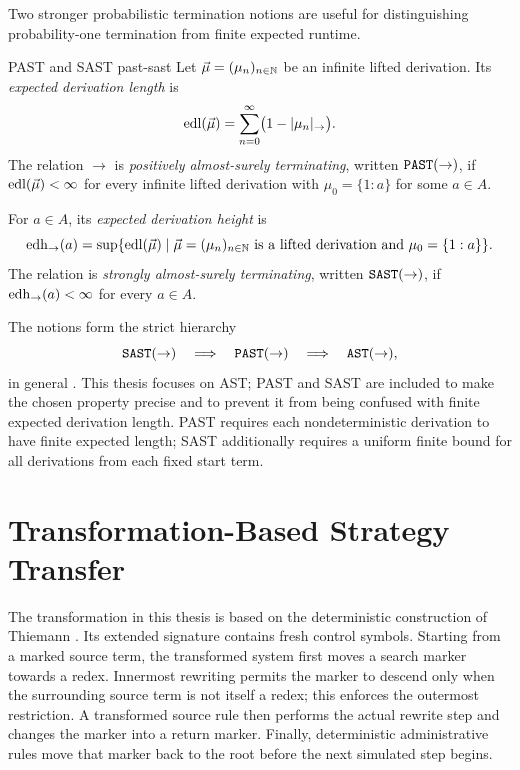Two stronger probabilistic termination notions are useful for distinguishing
probability-one termination from finite expected runtime.

\begin{Definition}{PAST and SAST
  \cite{avanzini_dallago_yamada_2020,kassing_giesl_2025}}{past-sast}
  Let $\vec\mu=(\mu_n)_{n\in\mathbb{N}}$ be an infinite lifted derivation.  Its
  \emph{expected derivation length} is
  \[
    \operatorname{edl}(\vec\mu)
      =\sum_{n=0}^{\infty}\bigl(1-|\mu_n|_{\to}\bigr).
  \]
  The relation $\to$ is \emph{positively almost-surely terminating}, written
  $\PAST[\to]$, if $\operatorname{edl}(\vec\mu)<\infty$ for every infinite lifted derivation
  with $\mu_0=\{1:a\}$ for some $a\in A$.

  For $a\in A$, its \emph{expected derivation height} is
  \[
    \operatorname{edh}_{\to}(a)
      =\sup\{\operatorname{edl}(\vec\mu)\mid
        \vec\mu=(\mu_n)_{n\in\mathbb{N}}\text{ is a lifted derivation and }
        \mu_0=\{1:a\}\}.
  \]
  The relation is \emph{strongly almost-surely terminating}, written
  $\SAST[\to]$, if $\operatorname{edh}_{\to}(a)<\infty$ for every $a\in A$.
\end{Definition}

The notions form the strict hierarchy
\[
  \SAST[\to]\quad\Longrightarrow\quad
  \PAST[\to]\quad\Longrightarrow\quad
  \AST[\to],
\]
in general \cite{avanzini_dallago_yamada_2020,kassing_giesl_2025}.  This thesis
focuses on AST; PAST and SAST are included to make the chosen property precise
and to prevent it from being confused with finite expected derivation length.
PAST requires each nondeterministic derivation to have finite expected length;
SAST additionally requires a uniform finite bound for all derivations from each
fixed start term.

\section{Transformation-Based Strategy Transfer}
\label{sec:transformation-background}

The transformation in this thesis is based on the deterministic construction
of Thiemann \cite{thiemann_2009_outermost}.  Its extended signature contains
fresh control symbols.  Starting from a marked source term, the transformed
system first moves a search marker towards a redex.  Innermost rewriting permits
the marker to descend only when the surrounding source term is not itself a
redex; this enforces the outermost restriction.  A transformed source rule then
performs the actual rewrite step and changes the marker into a return marker.
Finally, deterministic administrative rules move that marker back to the root
before the next simulated step begins.

